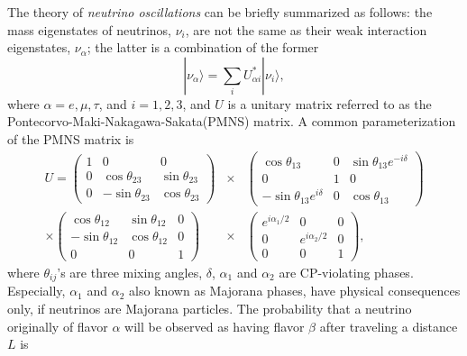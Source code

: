 The theory of \emph{neutrino oscillations} can be briefly summarized as follows: the mass eigenstates of neutrinos, $\nu_{i}$, are not the same as their weak interaction eigenstates, $\nu_{\alpha}$; the latter is a combination of the former
\begin{equation}
  \label{eq:osci}
  |\nu_{\alpha}\rangle=\sum_{i}U^{*}_{\alpha i}|\nu_{i}\rangle,
\end{equation}
where $\alpha=e,\mu,\tau$, and $i=1,2,3$, and $U$ is a unitary matrix referred to as the Pontecorvo-Maki-Nakagawa-Sakata(PMNS) matrix. A common parameterization of the PMNS matrix is
\begin{equation}
  \label{eq:pmns}
  \begin{array}{rcl}
    U = \left(\begin{array}{ccc}
        1 & 0 & 0 \\ 0 & \cos\theta_{23} & \sin\theta_{23} \\ 0 &         -\sin\theta_{23} & \cos\theta_{23}
      \end{array}\right) &\times&
    \left(\begin{array}{ccc}
        \cos\theta_{13} & 0 & \sin\theta_{13}e^{-i\delta} \\ 
        0 & 1 & 0 \\ -\sin\theta_{13}e^{i\delta} & 0 & \cos\theta_{13}
      \end{array}\right) \\\times
    \left(\begin{array}{ccc}
        \cos\theta_{12} & \sin\theta_{12} & 0 \\ -\sin\theta_{12} &         \cos\theta_{12} & 0 \\ 0 & 0 & 1
      \end{array}\right) &\times&
    \left(\begin{array}{ccc}
        e^{i\alpha_1/2} & 0 & 0 \\ 0 & e^{i\alpha_2/2} & 0 \\ 0 & 0 & 1
      \end{array}\right),
  \end{array}
\end{equation}
where $\theta_{ij}$'s are three mixing angles, $\delta$, $\alpha_1$ and $\alpha_2$ are CP-violating phases. Especially, $\alpha_1$ and $\alpha_2$ also known as Majorana phases, have physical consequences only, if neutrinos are Majorana particles. The probability that a neutrino originally of flavor $\alpha$ will be observed as having flavor $\beta$ after traveling a distance $L$ is
